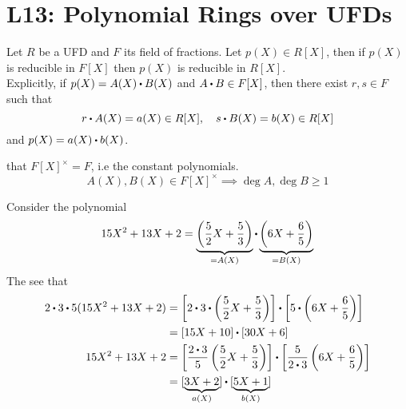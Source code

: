 \documentclass[../Main.tex]{subfiles}
\begin{document}
\chapter{L13: Polynomial Rings over UFDs}

\begin{lem}[title = Gauss' Lemma]
	Let $R$ be a UFD and $F$ its field of fractions. Let $p(X)\in R[X]$, then if $p(X)$ is reducible in $F[X]$ then $p(X)$ is reducible in $R[X]$.\\
	Explicitly, if $p(X)=A(X)\rdot B(X)$ and $A\rdot B\in F[X]$, then there exist $r,s\in F$ such that 
	\[r\rdot A(X) = a(X)\in R[X],\quad s\rdot B(X) = b(X) \in R[X]\]
	and $p(X) = a(X)\rdot b(X)$.
\end{lem}
\Obs that $F[X]^\times = F$, i.e the constant polynomials. 
\[A(X),B(X) \in F[X]^\times \implies \deg A, \deg B \ge 1\]
\begin{example}
	Consider the polynomial
	\[15X^2+13X+2 = \underbrace{\left(\frac{5}{2}X + \frac{5}{3}\right)}_{=A(X)}\rdot  \underbrace{\left(6X + \frac{6}{5}\right)}_{=B(X)}\]
	The see that
	\begin{align*}
	2\rdot 3\rdot 5(15X^2+13X+2) &= \left[2\rdot 3 \rdot \left(\frac{5}{2}X + \frac{5}{3}\right) \right] \rdot  \left[5\rdot \left(6X + \frac{6}{5}\right)\right] \\
	&= [15X+10] \rdot{}  [30X+6]\\
	15X^2+13X+2&=\left[\frac{2\rdot 3}{5}\left(\frac{5}{2}X+\frac{5}{3}\right)\right]\rdot \left[\frac{5}{2\rdot 3}\left(6X+\frac{6}{5}\right)\right]\\
	&= [\underbrace{3X+2}_{a(X)}]\rdot{}  [\underbrace{5X+1}_{b(X)}]
	\end{align*}
\end{example}	
\end{document}
